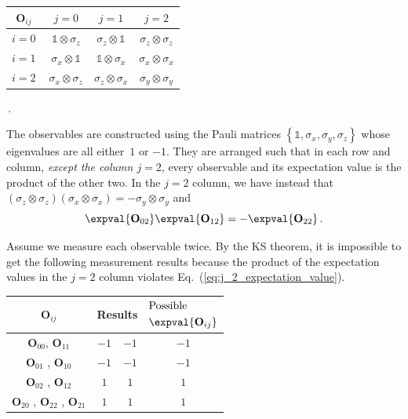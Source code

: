 \documentclass[english,reprint, aps, prl,superscriptaddress, showpacs,
showkeys, longbibliography, amsmath, amssymb, floatfix]{revtex4-1}
\theoremstyle{plain}
\theoremstyle{definition}
\begin{document}
{\renewcommand{\arraystretch}{2}%
\begin{center} 
\begin{tabular}{r|@{\quad}c@{\quad}|@{\quad}c@{\quad}|@{\quad}c@{\quad}|} 
$\mathbf{O}_{ij}$~ & $j=0$ & $j=1$ & $j=2$ \\ 
\hline  
$i=0~$ & $\mathbb{1}\otimes\sigma_{z}$  & $\sigma_{z}\otimes\mathbb{1}$  & $\sigma_{z}\otimes\sigma_{z}$ \tabularnewline 
\hline  
$i=1~$ & $\sigma_{x}\otimes\mathbb{1}$  & $\mathbb{1}\otimes\sigma_{x}$  & $\sigma_{x}\otimes\sigma_{x}$ \tabularnewline 
\hline  
$i=2~$ & $\sigma_{x}\otimes\sigma_{z}$  & $\sigma_{z}\otimes\sigma_{x}$  & $\sigma_{y}\otimes\sigma_{y}$ \tabularnewline 
\hline  
\end{tabular}\,.
\par\end{center} 
}

\noindent The observables are constructed using the Pauli matrices
$\left\{ \mathbb{1},\sigma_{x},\sigma_{y},\sigma_{z}\right\} $ whose
eigenvalues are all either~$1$ or $-1$.
They are arranged such that in each row and column, \emph{except the
column $j=2$}, every observable and its expectation value is the
product of the other two. In the $j=2$ column, we have instead that
$\left(\sigma_{z}\otimes\sigma_{z}\right)\left(\sigma_{x}\otimes\sigma_{x}\right)=-\sigma_{y}\otimes\sigma_{y}$
and 
\begin{equation}
\expval{\mathbf{O}_{02}}\expval{\mathbf{O}_{12}}=-\expval{\mathbf{O}_{22}}\,.\label{eq:j_2_expectation_value}
\end{equation}

Assume we measure each observable twice. By the KS theorem, it is
impossible to get the following measurement results because the product
of the expectation values in the $j=2$ column violates Eq.~(\ref{eq:j_2_expectation_value}).
\begin{center}
\begin{tabular}{cccc}
\toprule 
\addlinespace
$\mathbf{O}_{ij}$  & \multicolumn{2}{c}{Results} & $\begin{aligned} & \textrm{Possible}\\
 & \expval{\mathbf{O}_{ij}}
\end{aligned}
$\tabularnewline
\midrule
\midrule 
\addlinespace
$\mathbf{O}_{00}$, $\mathbf{O}_{11}$ & $-1$ & $-1$ & $-1$\tabularnewline
\midrule 
\addlinespace
$\mathbf{O}_{01}$ , $\mathbf{O}_{10}$  & $-1$ & $-1$ & $-1$\tabularnewline
\midrule 
\addlinespace
$\mathbf{O}_{02}$ , $\mathbf{O}_{12}$ & $1$ & $1$ & $1$\tabularnewline
\midrule 
\addlinespace
$\mathbf{O}_{20}$ , $\mathbf{O}_{22}$ , $\mathbf{O}_{21}$  & $1$ & $1$ & $1$\tabularnewline
\bottomrule
\end{tabular}
\par\end{center}
\end{document}
